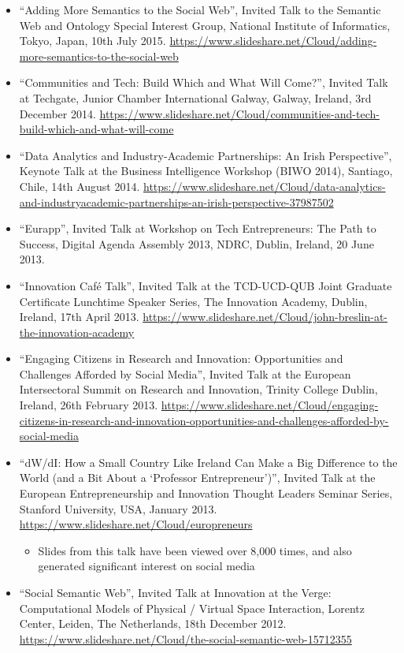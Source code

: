 \documentclass[10pt,a4paper]{res} %
\begin{document}
\begin{resume}
\begin{itemize}
\item ``Adding More Semantics to the Social Web'', Invited Talk to the Semantic Web and Ontology Special Interest Group, National Institute of Informatics, Tokyo, Japan, 10th July 2015. \url{https://www.slideshare.net/Cloud/adding-more-semantics-to-the-social-web}
\item ``Communities and Tech: Build Which and What Will Come?'', Invited Talk at Techgate, Junior Chamber International Galway, Galway, Ireland, 3rd December 2014. \url{https://www.slideshare.net/Cloud/communities-and-tech-build-which-and-what-will-come}
\item ``Data Analytics and Industry-Academic Partnerships: An Irish Perspective'', Keynote Talk at the Business Intelligence Workshop (BIWO 2014), Santiago, Chile, 14th August 2014. \url{https://www.slideshare.net/Cloud/data-analytics-and-industryacademic-partnerships-an-irish-perspective-37987502}
\item ``Eurapp'', Invited Talk at Workshop on Tech Entrepreneurs: The Path to Success, Digital Agenda Assembly 2013, NDRC, Dublin, Ireland, 20 June 2013.
\item ``Innovation Caf\'{e} Talk'', Invited Talk at the TCD-UCD-QUB Joint Graduate Certificate Lunchtime Speaker Series, The Innovation Academy, Dublin, Ireland, 17th April 2013. \url{https://www.slideshare.net/Cloud/john-breslin-at-the-innovation-academy}
\item ``Engaging Citizens in Research and Innovation: Opportunities and Challenges Afforded by Social Media'', Invited Talk at the European Intersectoral Summit on Research and Innovation, Trinity College Dublin, Ireland, 26th February 2013. \url{https://www.slideshare.net/Cloud/engaging-citizens-in-research-and-innovation-opportunities-and-challenges-afforded-by-social-media}
\item ``dW/dI: How a Small Country Like Ireland Can Make a Big Difference to the World (and a Bit About a `Professor Entrepreneur')'', Invited Talk at the European Entrepreneurship and Innovation Thought Leaders Seminar Series, Stanford University, USA, January 2013. \url{https://www.slideshare.net/Cloud/europreneurs}
\begin{itemize} \itemsep -2pt
\item Slides from this talk have been viewed over 8,000 times, and also generated significant interest on social media
\end{itemize}
\item ``Social Semantic Web'', Invited Talk at Innovation at the Verge: Computational Models of Physical / Virtual Space Interaction, Lorentz Center, Leiden, The Netherlands, 18th December 2012. \url{https://www.slideshare.net/Cloud/the-social-semantic-web-15712355}

\end{itemize}
\end{resume}
\end{document}
